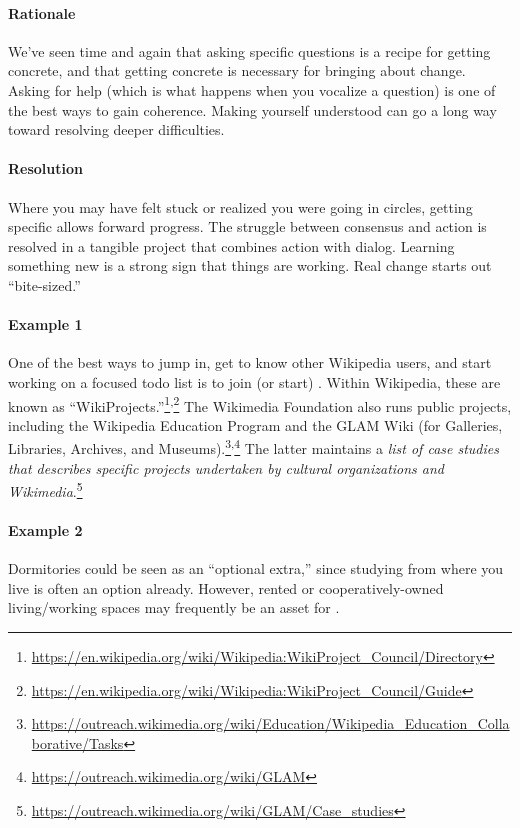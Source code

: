 \begin{refsection}
\paragraph{Rationale} 
We've seen time and again that asking specific questions is a recipe
for getting concrete, and that getting concrete is necessary for
bringing about change.  Asking for help (which is what happens
when you vocalize a question) is one of the best ways to
gain coherence.  Making yourself understood can go a long way
toward resolving deeper difficulties.

\paragraph{Resolution}
Where you may have felt stuck or realized you were going in circles, getting specific allows forward progress.  The struggle between consensus and action is resolved in a tangible project that combines action with dialog.  Learning something new is a strong sign that things are working.
%
Real change starts out ``bite-sized.'' 

\paragraph{Example 1}
One of the best ways to jump in, get to know other Wikipedia users,
and start working on a focused todo list is to join (or start)
.  Within Wikipedia, these are known
as
``WikiProjects.''\footnote{\url{https://en.wikipedia.org/wiki/Wikipedia:WikiProject_Council/Directory}}\textsuperscript{,}\footnote{\url{https://en.wikipedia.org/wiki/Wikipedia:WikiProject_Council/Guide}}
The Wikimedia Foundation also runs public projects, including the Wikipedia Education Program and the GLAM Wiki (for Galleries, Libraries, Archives, and Museums).\footnote{\url{https://outreach.wikimedia.org/wiki/Education/Wikipedia_Education_Collaborative/Tasks}}\textsuperscript{,}\footnote{\url{https://outreach.wikimedia.org/wiki/GLAM}}  The latter maintains a \emph{list of case studies that describes specific projects undertaken by cultural organizations and Wikimedia}.\footnote{\url{https://outreach.wikimedia.org/wiki/GLAM/Case_studies}}

\paragraph{Example 2}
Dormitories could be seen as an ``optional extra,'' since studying
from where you live is often an option already.  However,
rented or
cooperatively-owned living/working spaces may frequently be an asset
for .


\end{refsection}
